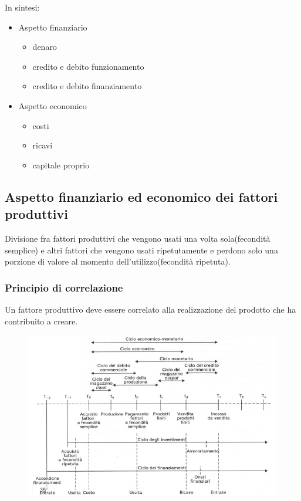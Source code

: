 In sintesi:
\begin{itemize}
    \item Aspetto finanziario
        \begin{itemize}
            \item denaro
            \item credito e debito funzionamento
            \item credito e debito finanziamento
        \end{itemize}
    \item Aspetto economico
        \begin{itemize}
            \item costi
            \item ricavi
            \item capitale proprio
        \end{itemize}
\end{itemize}

\subsection{Aspetto finanziario ed economico dei fattori produttivi}
Divisione fra fattori produttivi che vengono usati una volta sola(fecondità semplice)
e altri fattori che vengono usati ripetutamente e perdono solo una porzione di valore al momento 
dell'utilizzo(fecondità ripetuta).

\subsubsection{Principio di correlazione}
Un fattore produttivo deve essere correlato alla realizzazione del prodotto che ha 
contribuito a creare.



\begin{figure}[H]
    \centering
    \includegraphics[width=0.7\linewidth]{2/img/Screenshot from 2022-07-05 16-11-59.png}
\end{figure}